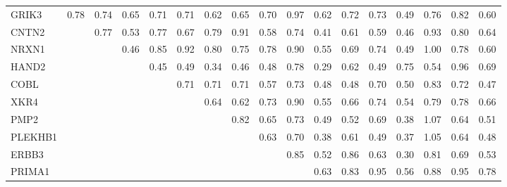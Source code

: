 \begin{longtable}{lrrrrrrrrrrrrrrrr}
\bottomrule
\endlastfoot
GRIK3   &        0.78 &        0.74 &        0.65 &       0.71 &       0.71 &       0.62 &          0.65 &        0.70 &         0.97 &        0.62 &        0.72 &       0.73 &        0.49 &       0.76 &        0.82 &         0.60 \\
CNTN2   &             &        0.77 &        0.53 &       0.77 &       0.67 &       0.79 &          0.91 &        0.58 &         0.74 &        0.41 &        0.61 &       0.59 &        0.46 &       0.93 &        0.80 &         0.64 \\
NRXN1   &             &             &        0.46 &       0.85 &       0.92 &       0.80 &          0.75 &        0.78 &         0.90 &        0.55 &        0.69 &       0.74 &        0.49 &       1.00 &        0.78 &         0.60 \\
HAND2   &             &             &             &       0.45 &       0.49 &       0.34 &          0.46 &        0.48 &         0.78 &        0.29 &        0.62 &       0.49 &        0.75 &       0.54 &        0.96 &         0.69 \\
COBL    &             &             &             &            &       0.71 &       0.71 &          0.71 &        0.57 &         0.73 &        0.48 &        0.48 &       0.70 &        0.50 &       0.83 &        0.72 &         0.47 \\
XKR4    &             &             &             &            &            &       0.64 &          0.62 &        0.73 &         0.90 &        0.55 &        0.66 &       0.74 &        0.54 &       0.79 &        0.78 &         0.66 \\
PMP2    &             &             &             &            &            &            &          0.82 &        0.65 &         0.73 &        0.49 &        0.52 &       0.69 &        0.38 &       1.07 &        0.64 &         0.51 \\
PLEKHB1 &             &             &             &            &            &            &               &        0.63 &         0.70 &        0.38 &        0.61 &       0.49 &        0.37 &       1.05 &        0.64 &         0.48 \\
ERBB3   &             &             &             &            &            &            &               &             &         0.85 &        0.52 &        0.86 &       0.63 &        0.30 &       0.81 &        0.69 &         0.53 \\
PRIMA1  &             &             &             &            &            &            &               &             &              &        0.63 &        0.83 &       0.95 &        0.56 &       0.88 &        0.95 &         0.78 \\

\end{longtable}
